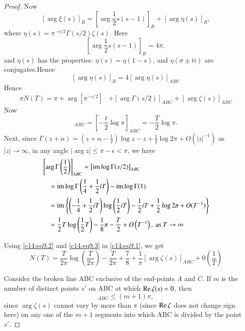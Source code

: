 \begin{proof}
Now
$$
[\arg \xi (s)]_R = \left[\arg\frac{1}{2} s (s-1)\right]_R + [\arg\eta (s)]_R,
$$
where $\eta(s) = \pi^{-s/2} \Gamma (s/2)\zeta(s)$. Here
$$
\left[\arg \frac{1}{2}s(s-1)\right]_R = 4 \pi,
$$
and $\eta(s)$ has the properties: $\eta(s) = \eta(1-s)$, and
$\eta(\sigma \pm ti)$ are conjugates.\pageoriginale Hence
$$
[\arg \eta(s)]_R = 4 [\arg \eta(s)]_{ABC}
$$
Hence
\begin{align}
\pi N(T) = \pi + \arg [\pi^{-s/2}] & + [\arg \Gamma(s/2)]_{ABC} + [\arg \zeta(s)]_{ABC}\label{c14:eq9.1}
\end{align}
Now 
\begin{equation}
[\arg \pi^{-s/2}]_{ABC} = \left[-\frac{t}{2} \log \pi \right]_{ABC} =
- \frac{T}{2} \log \pi. \label{c14:eq9.2}
\end{equation}
Next, since $\Gamma (z+\alpha) = (z+\alpha -\frac{1}{2}) \log z -z +
\frac{1}{2} \log 2 \pi + O(|z|^{-1})$  as $|z| \to \infty$, in any
angle $|\arg z| \leq \pi - \epsilon <\pi$, we have
\eject
\begin{align}
&\left[\arg\Gamma\left(\frac{1}{2}\right) \right]_{ABC} = \left[\operatorname{im} \log \Gamma
  (s/2) \right]_{ABC}\notag\\
&\quad =\operatorname{im} \log \Gamma \left(\frac{1}{4} + \frac{1}{2} i T \right)   - \operatorname{im} \log \Gamma
(1)\notag\\
&\quad = \operatorname{im} \left\{ \left(-\frac{1}{4} + \frac{1}{2} i T \right) \log \left(\frac{1}{2} i T \right)
- \frac{1}{2} i T + \frac{1}{2} \log 2 \pi + O (T^{-1})\right\}\notag\\
&\quad = \frac{1}{2} T \log \left(\frac{1}{2}T \right) - \frac{1}{8} \pi -\frac{T}{2} +
O \left(T^{-1} \right), \text{ as } T \to \infty\label{c14:eq9.3}
\end{align}

Using \eqref{c14:eq9.2} and \eqref{c14:eq9.3} in \eqref{c14:eq9.1}, we get
\begin{equation}
N(T) = \frac{T}{2\pi} \log \left(\frac{T}{2\pi}\right) - \frac{T}{2\pi} +
\frac{7}{8} + \frac{1}{\pi} [\arg \zeta(s)]_{ABC} + 0 \left(
\frac{1}{T}\right) \label{c14:eq9.4}
\end{equation}

Consider the broken line ABC exclusive of the end-points $A$ and
$C$. If $m$ is the number of distinct points $s'$ on ABC at which $\operatorname{Re}
\zeta (s) =0$, then 
\begin{equation}
[\arg \zeta(s)]_{ABC} \leq (m+1) \pi,\label{c14:eq9.5}
\end{equation}\pageoriginale
since $\arg \zeta(s)$ cannot vary by more than $\pi$ (since $\operatorname{Re}
\zeta$ does not change sign here) on any one of the $m+1$ segments
into which ABC is divided by the point $s'$.


\end{proof}
